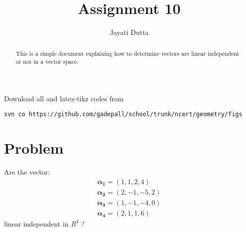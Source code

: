 \documentclass[journal,12pt,twocolumn]{IEEEtran}
\begin{document}
\let\StandardTheFigure\thefigure
\let\vec\mathbf
\renewcommand{\thefigure}{\theproblem}



\def\putbox#1#2#3{\makebox[0in][l]{\makebox[#1][l]{}\raisebox{\baselineskip}[0in][0in]{\raisebox{#2}[0in][0in]{#3}}}}
     \def\rightbox#1{\makebox[0in][r]{#1}}
     \def\centbox#1{\makebox[0in]{#1}}
     \def\topbox#1{\raisebox{-\baselineskip}[0in][0in]{#1}}
     \def\midbox#1{\raisebox{-0.5\baselineskip}[0in][0in]{#1}}

\vspace{3cm}


\title{Assignment 10}
\author{Jayati Dutta}





\maketitle

\newpage


\bigskip

\renewcommand{\thefigure}{\theenumi}
\renewcommand{\thetable}{\theenumi}


\begin{abstract}
This is a simple document explaining how to determine vectors are linear independent or not in a vector space.
\end{abstract}

%

Download all and latex-tikz codes from 
%
\begin{lstlisting}
svn co https://github.com/gadepall/school/trunk/ncert/geometry/figs
\end{lstlisting}
%


\section{Problem}
Are the vector:
\begin{align}
\vec{\alpha_1} = (1,1,2,4)\\
\vec{\alpha_2} = (2,-1,-5,2)\\
\vec{\alpha_3} = (1,-1,-4,0)\\
\vec{\alpha_4} = (2,1,1,6)
\end{align}
linear independent in $R^4$ ?
\end{document}
